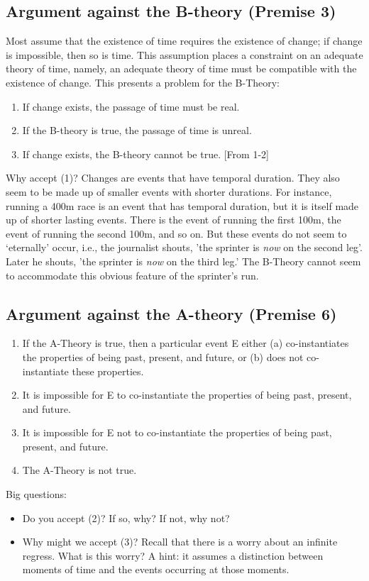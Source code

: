 \documentclass[oneside, 11]{article}
\begin{document}
\subsection*{Argument  against the B-theory (Premise 3)}
Most assume that the existence of time requires the existence of change; if change is impossible, then so is time. This assumption places a constraint on an adequate theory of time, namely, an adequate theory of time must be compatible with the existence of change. This presents a problem for the B-Theory: 
\begin{enumerate}
\item If change exists, the passage of time must be real.
\item If the B-theory is true, the passage of time is unreal.
\item If change exists, the B-theory cannot be true. [From 1-2]
\end{enumerate} 
Why accept (1)?  Changes are events that have temporal duration. They also seem to be made up of smaller events with shorter durations. For instance, running a 400m race is an event that has temporal duration, but it is itself made up of shorter lasting events. There is the event of running the first 100m, the event of running the second 100m, and so on. But these events do not seem to `eternally' occur, i.e., the journalist shouts, 'the sprinter is \emph{now} on the second leg'. Later he shouts, 'the sprinter is \emph{now} on the third leg.'  The B-Theory cannot seem to accommodate this obvious feature of the sprinter's run. 
 

\subsection*{Argument against the A-theory (Premise 6)}

\begin{enumerate}
\item If the A-Theory is true, then a particular event E either (a) co-instantiates the properties of being past, present, and future, or (b) does not co-instantiate these properties. 
\item It is impossible for E to co-instantiate the properties of being past, present, and future.
\item It is impossible for E not to co-instantiate the properties of being past, present, and future. 
\item The A-Theory is not true. 
\end{enumerate}
Big questions:
\begin{itemize}
\item Do you accept (2)? If so, why? If not, why not? 
\item Why might we accept (3)? Recall that there is a worry about an infinite regress. What is this worry? A hint: it assumes a distinction between moments of time and the events occurring at those moments.
\end{itemize}
\end{document}
